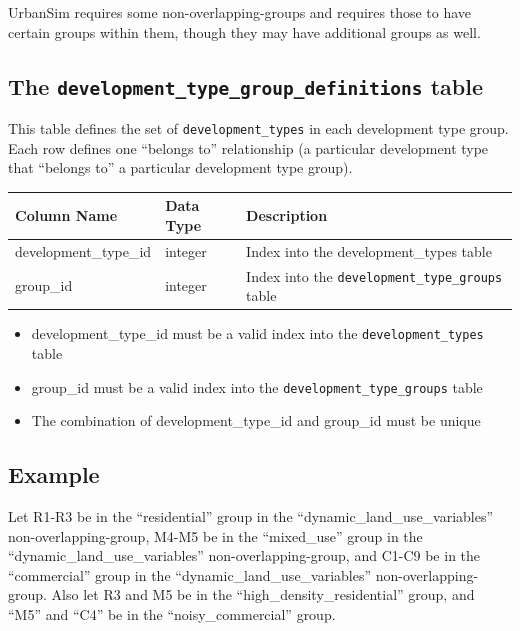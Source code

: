 UrbanSim requires some non-overlapping-groups and requires those to have
certain groups within them, though they may have additional groups as well.

\subsection{The {\tt development_type_group_definitions} table}

This table defines the set of \verb|development_types| in each
development type group. Each row defines one ``belongs to'' relationship (a
particular development type that ``belongs to'' a particular
development type group).

\begin{tabular}{|l|l|l|}
\hline
\textbf{Column Name} & \textbf{Data Type} & \textbf{Description} \\

\hline
development_type_id & integer & Index into the development_types table  \\
\hline
group_id & integer & Index into the \verb|development_type_groups| table  \\
\hline

\end{tabular}

\begin{itemize}
\tight
\item development_type_id must be a valid index into the \verb|development_types| table
\item group_id must be a valid index into the \verb|development_type_groups| table
\item The combination of development_type_id and group_id must be unique

\end{itemize}

\subsection{Example}

Let R1-R3 be in the
``residential'' group in the ``dynamic_land_use_variables''
non-overlapping-group, M4-M5 be in the ``mixed_use'' group in the
``dynamic_land_use_variables'' non-overlapping-group, and C1-C9 be in the
``commercial'' group in the ``dynamic_land_use_variables'' \variablesindex
non-overlapping-group. Also let R3 and M5 be in the
``high_density_residential'' group, and ``M5'' and ``C4'' be in the
``noisy_commercial'' group.

